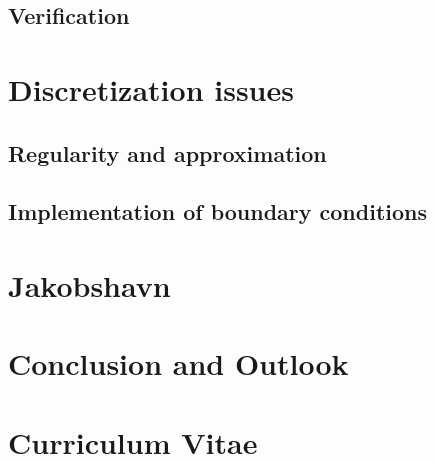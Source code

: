 \documentclass[a4paper,twoside,11pt,pdftex]{report}
\begin{document}
\section{Verification}\label{sec:verification}


\cleardoublepage
\chapter{Discretization issues}\label{chap:discretization}
\section{Regularity and approximation}\label{sec:regularity}


\section{Implementation of boundary conditions}\label{sec:slip}


\cleardoublepage
% 

\chapter{Jakobshavn}\label{chap:jakobshavn}

\cleardoublepage

\chapter{Conclusion and Outlook}\label{chap:outlook}

\cleardoublepage



\cleardoublepage

\appendix

\pagestyle{plain}
\chapter*{Curriculum Vitae}
\end{document}
